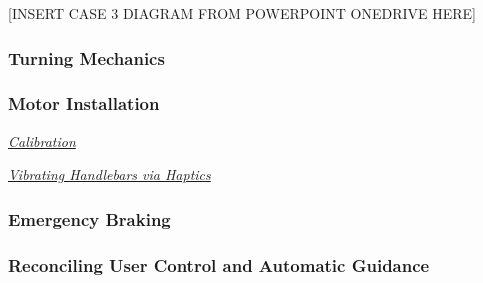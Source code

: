 [INSERT CASE 3 DIAGRAM FROM POWERPOINT ONEDRIVE HERE]

\subsubsection{Turning Mechanics}

\subsubsection{Motor Installation}
\noindent \underline{\textit{Calibration}}

\noindent \underline{\textit{Vibrating Handlebars via Haptics}}

\subsubsection{Emergency Braking}

\subsubsection{Reconciling User Control and Automatic Guidance}
